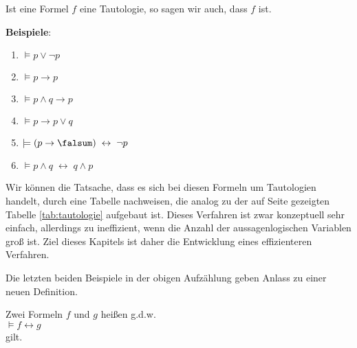 \noindent
Ist eine Formel $f$ eine Tautologie, so sagen wir auch, dass $f$
  ist.

\noindent
\textbf{Beispiele}:
\begin{enumerate}
\item $\models p \vee \neg p$
\item $\models p \rightarrow p$
\item $\models p \wedge q \rightarrow p$
\item $\models p \rightarrow p \vee q$
\item $\models (p \rightarrow \falsum) \;\leftrightarrow\; \neg p$
\item $\models p \wedge q \;\leftrightarrow\; q \wedge p$
\end{enumerate}
Wir können die Tatsache, dass es sich bei diesen Formeln um Tautologien handelt, durch
eine Tabelle nachweisen, die analog zu der auf Seite \pageref{tab:tautologie} gezeigten
Tabelle \ref{tab:tautologie} aufgebaut ist.  Dieses Verfahren ist zwar konzeptuell sehr
einfach, allerdings zu ineffizient, wenn die Anzahl der aussagenlogischen Variablen groß
ist.  Ziel dieses Kapitels ist daher die Entwicklung eines effizienteren Verfahren.

Die letzten beiden Beispiele in der obigen Aufzählung geben Anlass zu einer neuen Definition.
\begin{Definition}[Äquivalent]
  Zwei Formeln $f$ und $g$ heißen   g.d.w.  \\[0.2cm]
  \hspace*{1.3cm} $\models f \leftrightarrow g$ 
  \\[0.1cm]
  gilt.
  \eox
\end{Definition}

